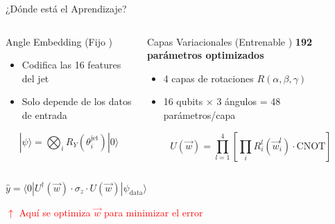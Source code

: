 \documentclass[aspectratio=43]{beamer}
\begin{document}
\begin{frame}{¿Dónde está el Aprendizaje?}
  \begin{columns}
    \begin{column}{0.49\textwidth}
      \begin{block}{Angle Embedding (Fijo )}
        \begin{itemize}
          \item Codifica las 16 features del jet
          \item Solo depende de los datos de entrada
        \end{itemize}
        $$|\psi\rangle = \bigotimes_i R_Y(\theta_i^{\text{jet}})|0\rangle$$
      \end{block}
    \end{column}
    
    \begin{column}{0.49\textwidth}
      \begin{alertblock}{Capas Variacionales (Entrenable )}
        \textbf{192 parámetros optimizados}
        \begin{itemize}
          \item 4 capas de rotaciones $R(\alpha, \beta, \gamma)$
          \item 16 qubits $\times$ 3 ángulos = 48 parámetros/capa
        \end{itemize}
        $$U(\vec{w}) = \prod_{l=1}^{4} \left[\prod_i R_i^l(\vec{w}_i^l) \cdot \text{CNOT}\right]$$
      \end{alertblock}
    \end{column}
  \end{columns}
  
  \vspace{1em}
  \begin{center}
    \Large
    $\hat{y} = \langle 0 | U^\dagger(\vec{w}) \cdot \sigma_z \cdot U(\vec{w}) | \psi_{\text{data}} \rangle$
    
    \textcolor{red}{$\uparrow$ Aquí se optimiza $\vec{w}$ para minimizar el error}
  \end{center}
\end{frame}
\end{document}
